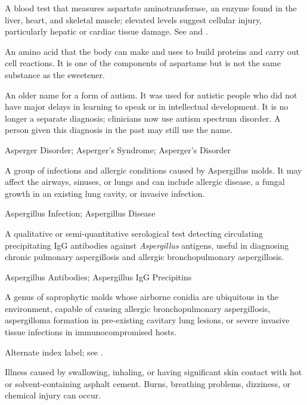  A blood test that measures aspartate aminotransferase, an enzyme found in the liver, heart, and skeletal muscle; elevated levels suggest cellular injury, particularly hepatic or cardiac tissue damage. See  and .

 An amino acid that the body can make and uses to build proteins and carry out cell reactions. It is one of the components of aspartame but is not the same substance as the sweetener.

 An older name for a form of autism. It was used for
autistic people who did not have major delays in learning to speak or in
intellectual development. It is no longer a separate diagnosis; clinicians now
use autism spectrum disorder. A person given this diagnosis in the past may
still use the name.

\synonyms
Asperger Disorder; Asperger's Syndrome; Asperger's Disorder

 A group of infections and allergic conditions caused by Aspergillus molds. It may affect the airways, sinuses, or lungs and can include allergic disease, a fungal growth in an existing lung cavity, or invasive infection.

\synonyms
Aspergillus Infection; Aspergillus Disease

 A qualitative or semi-quantitative serological test detecting circulating precipitating IgG antibodies against \textit{Aspergillus} antigens, useful in diagnosing chronic pulmonary aspergillosis and allergic bronchopulmonary aspergillosis.

\synonyms
Aspergillus Antibodies; Aspergillus IgG Precipitins

 A genus of saprophytic molds whose airborne conidia are ubiquitous in the environment, capable of causing allergic bronchopulmonary aspergillosis, aspergilloma formation in pre-existing cavitary lung lesions, or severe invasive tissue infections in immunocompromised hosts.

 Alternate index label; see .

 Illness caused by swallowing, inhaling, or having significant skin contact with hot or solvent-containing asphalt cement. Burns, breathing problems, dizziness, or chemical injury can occur.


